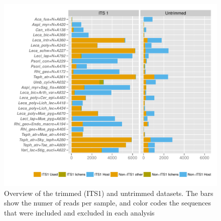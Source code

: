 \documentclass[a4paper, 11]{article}\usepackage[]{graphicx}\usepackage[]{color}
\makeatletter
\def\maxwidth{ %
  \ifdim\Gin@nat@width>\linewidth
    \linewidth
  \else
    \Gin@nat@width
  \fi
}
\newenvironment{knitrout}{}{} %
\makeatother
\begin{document}
%
%
%
%
%
\begin{knitrout}
\color{fgcolor}\begin{figure}[H]
\includegraphics[width=\maxwidth]{figure/3_2_IntroReads-1} \caption[Overview of the trimmed (ITS1) and untrimmed datasets]{Overview of the trimmed (ITS1) and untrimmed datasets. The bars show the numer of reads per sample, and color codes the sequences that were included and excluded in each analysis}\label{fig:3_2_IntroReads}
\end{figure}


\end{knitrout}
%
%
%
%
\newpage
\end{document}

